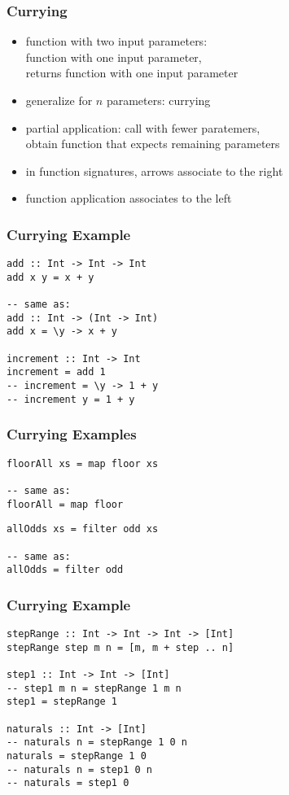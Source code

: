 \documentclass[dvipsnames]{beamer}
\theoremstyle{plain}
\begin{document}
\begin{frame}
  \frametitle{Currying}

  \begin{itemize}
    \item function with two input parameters:\\
      function with one input parameter,\\
      returns function with one input parameter
    \item generalize for $n$ parameters: \alert{currying}

    \pause
    \bigskip
    \item \alert{partial application}: call with fewer paratemers,\\
      obtain function that expects remaining parameters

    \pause
    \medskip
    \item in function signatures, arrows associate to the right
    \item function application associates to the left
  \end{itemize}
\end{frame}

\begin{frame}[fragile]
  \frametitle{Currying Example}

  \begin{lstlisting}
add :: Int -> Int -> Int
add x y = x + y

-- same as:
add :: Int -> (Int -> Int)
add x = \y -> x + y

increment :: Int -> Int
increment = add 1
-- increment = \y -> 1 + y
-- increment y = 1 + y
  \end{lstlisting}
\end{frame}

\begin{frame}[fragile]
  \frametitle{Currying Examples}

  \begin{lstlisting}
floorAll xs = map floor xs

-- same as:
floorAll = map floor
  \end{lstlisting}

  \pause
  \medskip
  \begin{lstlisting}
allOdds xs = filter odd xs

-- same as:
allOdds = filter odd
  \end{lstlisting}
\end{frame}

\begin{frame}[fragile]
  \frametitle{Currying Example}

  \begin{lstlisting}
stepRange :: Int -> Int -> Int -> [Int]
stepRange step m n = [m, m + step .. n]

step1 :: Int -> Int -> [Int]
-- step1 m n = stepRange 1 m n
step1 = stepRange 1

naturals :: Int -> [Int]
-- naturals n = stepRange 1 0 n
naturals = stepRange 1 0
-- naturals n = step1 0 n
-- naturals = step1 0
  \end{lstlisting}
\end{frame}
\end{document}
